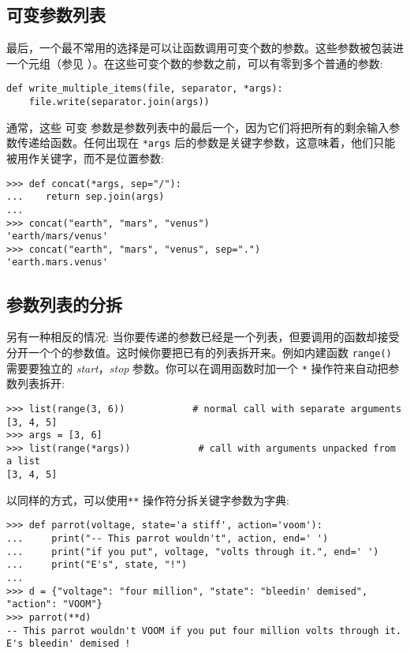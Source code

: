 \subsection{可变参数列表}
最后，一个最不常用的选择是可以让函数调用可变个数的参数。这些参数被包装进一个元组（参见 ）。在这些可变个数的参数之前，可以有零到多个普通的参数:
\begin{lstlisting}
def write_multiple_items(file, separator, *args):
    file.write(separator.join(args))
\end{lstlisting}
通常，这些 可变 参数是参数列表中的最后一个，因为它们将把所有的剩余输入参数传递给函数。任何出现在 \texttt{*args} 后的参数是关键字参数，这意味着，他们只能被用作关键字，而不是位置参数:
\begin{lstlisting}
>>> def concat(*args, sep="/"):
...    return sep.join(args)
...
>>> concat("earth", "mars", "venus")
'earth/mars/venus'
>>> concat("earth", "mars", "venus", sep=".")
'earth.mars.venus'
\end{lstlisting}
\subsection{参数列表的分拆\label{ControlFlowTools:UnpackArg}}
另有一种相反的情况: 当你要传递的参数已经是一个列表，但要调用的函数却接受分开一个个的参数值。这时候你要把已有的列表拆开来。例如内建函数 \texttt{range()} 需要要独立的 \emph{start}，\emph{stop} 参数。你可以在调用函数时加一个 \verb|*| 操作符来自动把参数列表拆开:
\begin{lstlisting}
>>> list(range(3, 6))            # normal call with separate arguments
[3, 4, 5]
>>> args = [3, 6]
>>> list(range(*args))            # call with arguments unpacked from a list
[3, 4, 5]
\end{lstlisting}
以同样的方式，可以使用\verb|**| 操作符分拆关键字参数为字典:
\begin{lstlisting}
>>> def parrot(voltage, state='a stiff', action='voom'):
...     print("-- This parrot wouldn't", action, end=' ')
...     print("if you put", voltage, "volts through it.", end=' ')
...     print("E's", state, "!")
...
>>> d = {"voltage": "four million", "state": "bleedin' demised", "action": "VOOM"}
>>> parrot(**d)
-- This parrot wouldn't VOOM if you put four million volts through it. E's bleedin' demised !
\end{lstlisting}
